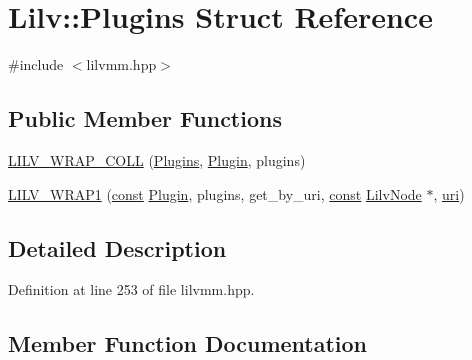 \hypertarget{struct_lilv_1_1_plugins}{}\section{Lilv\+:\+:Plugins Struct Reference}
\label{struct_lilv_1_1_plugins}


{\ttfamily \#include $<$lilvmm.\+hpp$>$}

\subsection*{Public Member Functions}
\begin{DoxyCompactItemize}
\item 
\hyperlink{struct_lilv_1_1_plugins_a02ab8ba3cae3fd5efae8a56685987a9e}{L\+I\+L\+V\+\_\+\+W\+R\+A\+P\+\_\+\+C\+O\+LL} (\hyperlink{struct_lilv_1_1_plugins}{Plugins}, \hyperlink{struct_lilv_1_1_plugin}{Plugin}, plugins)
\item 
\hyperlink{struct_lilv_1_1_plugins_a559c2f08694ef71305e2c1b2e60bca45}{L\+I\+L\+V\+\_\+\+W\+R\+A\+P1} (\hyperlink{getopt1_8c_a2c212835823e3c54a8ab6d95c652660e}{const} \hyperlink{struct_lilv_1_1_plugin}{Plugin}, plugins, get\+\_\+by\+\_\+uri, \hyperlink{getopt1_8c_a2c212835823e3c54a8ab6d95c652660e}{const} \hyperlink{lilv_8h_ae183dca3dca5368d34dbd863a405437b}{Lilv\+Node} $\ast$, \hyperlink{lib_2expat_8h_a5a9fdd6c2606370ad12f24c078ac6585}{uri})
\end{DoxyCompactItemize}


\subsection{Detailed Description}


Definition at line 253 of file lilvmm.\+hpp.



\subsection{Member Function Documentation}
